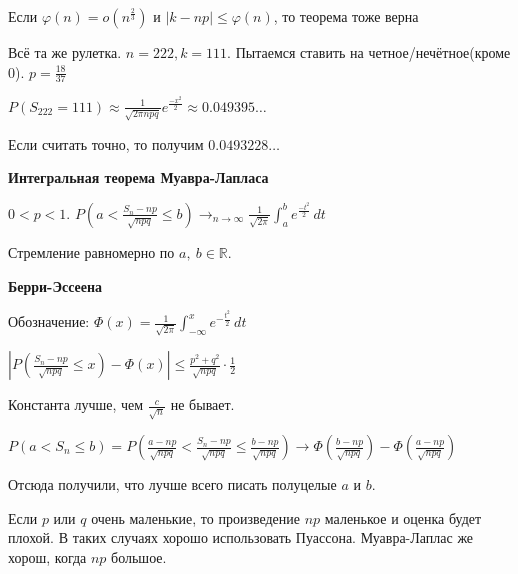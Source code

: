 \begin{remark}
    Если $\varphi (n) = o(n^\frac{2}{3})$ и $|k - np| \leqslant \varphi (n)$, то теорема тоже верна
\end{remark}

\begin{example}
    Всё та же рулетка. $n = 222, k = 111$. Пытаемся ставить на четное/нечётное(кроме 0). $p = \frac{18}{37}$

    $P(S_{222} = 111) \approx \frac{1}{\sqrt{2 \pi n p q}} e^{\frac{-x^2}{2}} \approx 0.049395\ldots$

    Если считать точно, то получим $0.0493228\ldots$
\end{example}

\begin{theorem}
    \textbf{Интегральная теорема Муавра-Лапласа}

    $0 < p < 1$. $P(a < \frac{S_n - np}{\sqrt{npq}} \leqslant b) \rightarrow_{n \to \infty} \frac{1}{\sqrt{2\pi}} \int_a^b e^{\frac{-t^2}{2}} \, dt$

    Стремление равномерно по $a, \ b \in \mathbb{R}$.
\end{theorem}

\begin{theorem}
    \textbf{Берри-Эссеена}

    Обозначение: $\Phi (x) = \frac{1}{\sqrt{2\pi}} \int_{-\infty}^x e^{-\frac{t^2}{2}} \, dt$

    $\left| P(\frac{S_n - np}{\sqrt{npq}} \leqslant x) - \Phi (x) \right| \leqslant \frac{p^2 + q^2}{\sqrt{npq}} \cdot \frac{1}{2}$

    \begin{remark}
        Константа лучше, чем $\frac{c}{\sqrt{n}}$ не бывает. 
    \end{remark}

    \begin{remark}
        $P(a < S_n \leqslant b) = P(\frac{a - np}{\sqrt{npq}} < \frac{S_n - np}{\sqrt{npq}} \leqslant \frac{b - np}{\sqrt{npq}}) \to
        \Phi (\frac{b - np}{\sqrt{npq}}) - \Phi (\frac{a - np}{\sqrt{npq}})$
    
        Отсюда получили, что лучше всего писать полуцелые $a$ и $b$.
    \end{remark}

    \begin{remark}
        Если $p$ или $q$ очень маленькие, то произведение $np$ маленькое и оценка будет плохой. В таких случаях хорошо
        использовать Пуассона. Муавра-Лаплас же хорош, когда $np$ большое.
    \end{remark}
\end{theorem}

